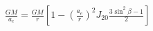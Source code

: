 \documentclass[10pt]{article}
\begin{document}
\begin{align*}\frac{G M}{a_{e}} = \frac{G M}{r} \left[ 1 - \left( \frac{a_{e}}{r} \right)^2 J_{20} \frac{ 3 \sin^2 \beta - 1}{2} \right]\end{align*}
\end{document}
